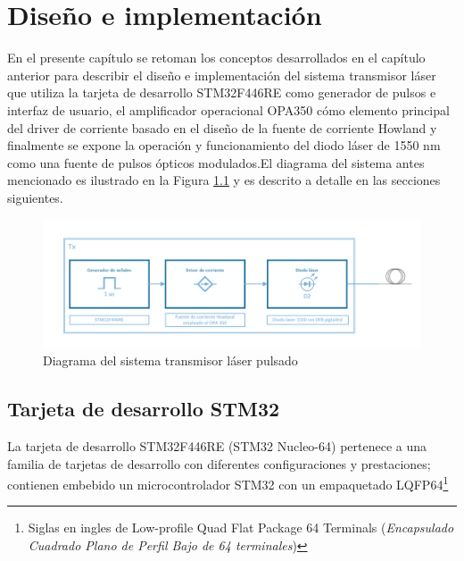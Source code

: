 

\chapter{Diseño e implementación}

En el presente capítulo se retoman los conceptos desarrollados en el capítulo anterior para describir el diseño e implementación del sistema transmisor láser que utiliza la tarjeta de desarrollo STM32F446RE como generador de pulsos e interfaz de usuario, el amplificador operacional OPA350 cómo elemento principal del driver de corriente basado en el diseño de la fuente de corriente Howland y finalmente se expone la operación y funcionamiento del diodo láser de 1550 nm como una fuente de pulsos ópticos modulados.El diagrama del sistema antes mencionado es ilustrado en la Figura \ref{Diagrama_tx} y es descrito a detalle en las secciones siguientes. 

\begin{figure}[H]
    \centering
    \includegraphics[width=14cm]{Figures/diagrama_1_pieces.png}
    \caption{Diagrama del sistema transmisor láser pulsado}
    \label{Diagrama_tx}
\end{figure}

\section{Tarjeta de desarrollo STM32}

La tarjeta de desarrollo STM32F446RE (STM32 Nucleo-64) pertenece a una familia de tarjetas de desarrollo con diferentes configuraciones y prestaciones; contienen embebido un microcontrolador STM32 con un empaquetado LQFP64\footnote{Siglas en ingles de Low-profile Quad Flat Package 64 Terminals (\textit{Encapsulado Cuadrado Plano de Perfil Bajo de 64 terminales})} 

